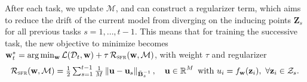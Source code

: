 \documentclass{article}
\newcommand{\our}{\textsc{sfr}\xspace}
\newcommand{\weights}{\ensuremath{\mathbf{w}}}
\newcommand{\mbf}[1]{\mathbf{#1}}
\newcommand{\MB}{\mbf{B}}
\newcommand{\MZ}{\mbf{Z}}
\newcommand{\vz}{\mbf{z}}
\newcommand{\vu}{\mbf{u}}
\begin{document}
After each task, we update $\mathcal{M}$, and can construct a regularizer term, which aims to reduce the drift of the current model from diverging on the inducing points $\MZ_s$ for all previous tasks $ s = 1, \ldots, t-1$. This means that for training  the successive task, the new objective to minimize becomes $\weights_t^* = \arg\min_{\weights} \mathcal{L}(\mathcal{D}_t, \weights) + \tau \, \mathcal{R}_\textrm{\our}(\weights, \mathcal{M})$, with weight $\tau$ and regularizer
%
\begin{equation}\label{eq-cl-regularizer}\textstyle
  \mathcal{R}_\mathrm{\our}(\weights, \mathcal{M}) = \frac{1}{2} \sum_{s=1}^{t-1} \frac{1}{M} 
	\left\lVert 
	\vu - \vu_s %
	\right\rVert_{\bar{\MB}^{-1}_{s}}, \quad \vu \in \R^M \text{~with~} u_{i} = f_{\weights}(\vz_{i}),~\forall {\vz_i} \in \mathcal{Z}_s .
\end{equation}
\end{document}
